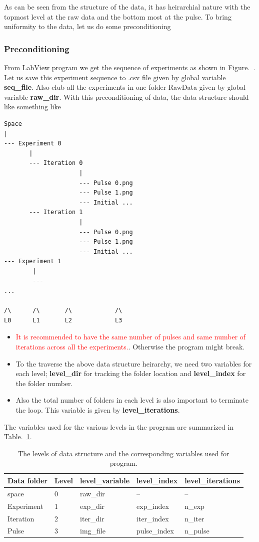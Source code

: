 \documentclass[12pt, twoside, a4paper]{article}
\begin{document}
As can be seen from the structure of the data, it has heirarchial nature with the topmost level at the raw data and the bottom most at the pulse. To bring uniformity to the data, let us do some preconditioning
\subsubsection{Preconditioning}
From LabView program we get the sequence of experiments as shown in Figure.~. Let us save this experiment sequence to .csv file given by global variable \textbf{seq\_file}. Also club all the experiments in one folder RawData given by global variable \textbf{raw\_dir}. With this preconditioning of data, the data structure should like something like
\begin{verbatim}
Space
|
--- Experiment 0
       |
       --- Iteration 0
                     |
                     --- Pulse 0.png
                     --- Pulse 1.png
                     --- Initial ...
       --- Iteration 1 
       				 |
       				 --- Pulse 0.png
       				 --- Pulse 1.png
       				 --- Initial ...
--- Experiment 1
        |
        --- 
...

/\      /\       /\            /\
L0      L1       L2            L3
\end{verbatim}
%
\begin{itemize}
	\item \textcolor{red}{It is recommended to have the same number of pulses and same number of iterations across all the experiments.}. Otherwise the program might break.
	\item  To the traverse the above data structure heirarchy, we need two variables for each level; \textbf{level\_dir} for tracking the folder location and \textbf{level\_index} for the folder number.
	\item  Also the total number of folders in each level is also important to terminate the loop. This variable is given by \textbf{level\_iterations}.
\end{itemize}
The variables used for the various levels in the program are summarized in Table.~\ref{table: structure of data}.
%
\begin{table}[!htbp]
	\centering
	\begin{tabular}{lllll}
		\hline\hline
		Data folder			& Level & 	level\_variable	&	level\_index	&	level\_iterations	\\
		\hline
		space				&	0  	& 	raw\_dir	&	-- 		&	--	\\
		Experiment			&	1	&	exp\_dir	&	exp\_index	&	n\_exp	\\
		Iteration		 	&	2	&	iter\_dir	&	iter\_index	&	n\_iter	\\
		Pulse				&	3	&	img\_file	&	pulse\_index &	n\_pulse	\\
		\hline \hline
	\end{tabular}
	\caption{The levels of data structure and the corresponding variables used for program.}
	\label{table: structure of data}
\end{table}
\end{document}
